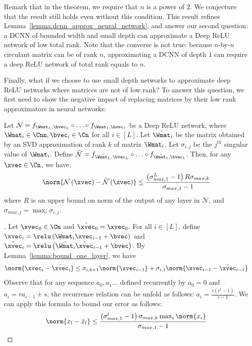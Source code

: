 Remark that in the theorem, we require that $n$ is a power of $2$.
We conjecture that the result still holds even without this condition.
This result refines Lemma~\ref{lemma:dcnn_approx_neural_network}, and answer our second question: a DCNN of bounded width and small depth can approximate a Deep ReLU network of low  total rank.
Note that the converse is not true: because $n$-by-$n$ circulant matrix can be of rank $n$, approximating a DCNN of depth $1$ can require a deep ReLU network of total rank equals to $n$.


Finally, what if we choose to use small depth networks to approximate deep ReLU networks where matrices are not of low rank?
To answer this question, we first need to show the negative impact of replacing matrices by their low rank approximators in neural networks:

\begin{proposition} \label{proposition:relu_to_svd}
Let $\mathcal{N} = f_{\Wmat_{L},\bvec_{L}} \circ \ldots \circ f_{\Wmat_{1},\bvec_{1}}$ be a Deep ReLU network, where $\Wmat_{i} \in \Cnn, \bvec_{i} \in \Cn$ for all $i \in [L]$. Let $\tilde{\Wmat}_{i}$ be the matrix obtained by an SVD approximation of rank $k$ of matrix $\Wmat_{i}$. Let $\sigma_{i,j}$ be the $j^{th}$ singular value of $\Wmat_{i}$. Define $\tilde{\mathcal{N}} = f_{\tilde{\Wmat_{L}},\bvec_{L}} \circ \ldots \circ f_{\tilde{\Wmat_{1}},\bvec_{1}}$. Then, for any $\xvec \in \Cn$, we have:
\begin{equation}
\norm{ \mathcal{N}\left(\xvec\right) - \tilde{\mathcal{N}} \left(\xvec\right)} \le \frac{\left(\sigma_{max,1}^{L}-1\right)R\sigma_{max,k}}{\sigma_{max,1}-1}
\end{equation}
where $R$ is an upper bound on norm of the output of any layer in $\mathcal{N}$, and $\sigma_{max,j} = \max_{i}\sigma_{i,j}$.
\end{proposition}

\begin{proof}[]
Let $\xvec_{0} \in \Cn$ and $\tilde{\xvec}_{0} = \xvec_{0}$.
For all $i \in [L]$, define $\xvec_{i} = \relu \left(\Wmat_{i} \xvec_{i-1} + \bvec \right)$ and $\tilde{\xvec}_{i} = \relu \left( \tilde{\Wmat_{i}} \tilde{\xvec}_{i-1} + \bvec \right)$.
By Lemma~\ref{lemma:bound_one_layer}, we have 
\begin{equation}
  \norm{ \xvec_{i} - \tilde{\xvec}_{i}} \le \sigma_{i,k+1} \norm{ \xvec_{i-1}} + \sigma_{i,1} \norm{ \xvec_{i-1} - \tilde{\xvec}_{i-1}} 
\end{equation}
Observe that for any sequence $a_{0}, a_{1} \ldots$ defined recurrently by $a_{0} = 0$ and $a_{i} = ra_{i-1} + s$, the recurrence relation can be unfold as follows: $a_{i} = \frac{s \left(r^{i} - 1\right)}{r-1}$.
We can apply this formula to bound our error as follows:
\begin{equation}
  \norm{ x_{l} - \tilde{x}_{l} } \le\frac{ \left( \sigma_{max,1}^{l} - 1 \right) \sigma_{max,k} \max_{i} \norm{ x_{i} } }{\sigma_{max,1}-1}
\end{equation}
\end{proof}

